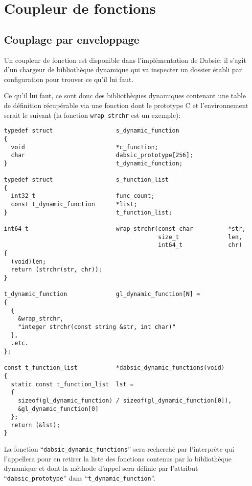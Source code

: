 \documentclass[a5paper, 12pt]{book}
\begin{document}
\chapter{Coupleur de fonctions}

\section{Couplage par enveloppage}

Un coupleur de fonction est disponible dans l'implémentation
de Dabsic: il s'agit d'un chargeur de bibliothèque dynamique
qui va inspecter un dossier établi par configuration pour
trouver ce qu'il lui faut.

Ce qu'il lui faut, ce sont donc des bibliothèques dynamiques
contenant une table de définition récupérable via une fonction
dont le prototype C et l'environnement serait le suivant
(la fonction \verb!wrap_strchr! est un exemple):\\

\begin{verbatim}
typedef struct                  s_dynamic_function
{
  void                          *c_function;
  char                          dabsic_prototype[256];
}                               t_dynamic_function;

typedef struct                  s_function_list
{
  int32_t                       func_count;
  const t_dynamic_function      *list;
}                               t_function_list;

int64_t                         wrap_strchr(const char          *str,
                                            size_t              len,
                                            int64_t             chr)
{
  (void)len;
  return (strchr(str, chr));
}

t_dynamic_function              gl_dynamic_function[N] =
{
  {
    &wrap_strchr,
    "integer strchr(const string &str, int char)"
  },
  .etc.
};

const t_function_list           *dabsic_dynamic_functions(void)
{
  static const t_function_list  lst =
  {
    sizeof(gl_dynamic_function) / sizeof(gl_dynamic_function[0]),
    &gl_dynamic_function[0]
  };
  return (&lst);
}
\end{verbatim}

La fonction ``\verb!dabsic_dynamic_functions!'' sera recherché par
l'interprète qui l'appellera pour en retirer la liste des
fonctions contenus par la bibliothèque dynamique et dont
la méthode d'appel sera définie par l'attribut
``\verb!dabsic_prototype!'' dans ``\verb!t_dynamic_function!''.
\end{document}
